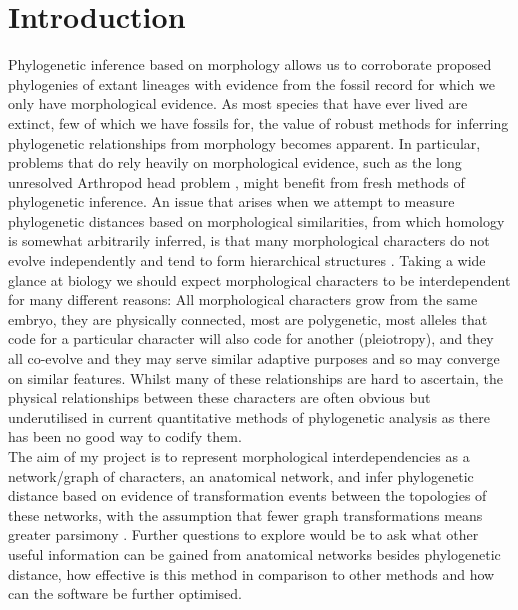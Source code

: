\documentclass[fontsize=11pt]{scrartcl}\usepackage[]{graphicx}\usepackage[]{color}
\begin{document}
  \section{Introduction} 
  Phylogenetic inference based on morphology allows us to corroborate proposed phylogenies of extant lineages with evidence from the fossil record for which we only have morphological evidence. 
  As most species that have ever lived are extinct, few of which we have fossils for, the value of robust methods for inferring phylogenetic relationships from morphology becomes apparent.
  In particular, problems that do rely heavily on morphological evidence, such as the long unresolved Arthropod head problem \cite{Budd2002,Rempel1975}, might benefit from fresh methods of phylogenetic inference. 
  An issue that arises when we attempt to measure phylogenetic distances based on morphological similarities, from which homology is somewhat arbitrarily inferred, is that many morphological 
  characters do not evolve independently and tend to form hierarchical structures \cite{Hopkins2021}. Taking a wide glance at biology we should expect morphological characters to be interdependent 
  for many different reasons: All morphological characters grow from 
  the same embryo, they are physically connected, most are polygenetic, most alleles that code for a particular character will also code 
  for another (pleiotropy), and they all co-evolve and they may serve similar adaptive purposes and so may converge on similar features. Whilst many of these 
  relationships are hard to ascertain, the physical relationships between these characters are often obvious but underutilised in current quantitative methods
  of phylogenetic analysis as there has been no good way to codify them. \\
  The aim of my project is to represent morphological interdependencies as a network/graph of characters, an anatomical network, and infer phylogenetic distance based on evidence of transformation events between the 
  topologies of these networks, with the assumption that fewer graph transformations means greater parsimony \cite{Grant2004}. Further questions to 
  explore would be to ask what other useful information can be gained from anatomical networks besides phylogenetic distance, how effective is this method in 
  comparison to other methods and how can the software be further optimised. 
  
\end{document}
